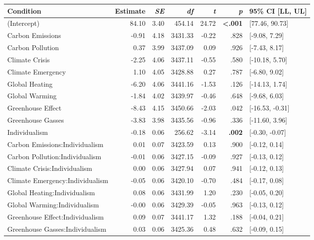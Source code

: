 \begin{table}[ht]
\centering
\begin{tabular}{lrrrrrl}
  \hline
Condition & Estimate & \textit{SE} & \textit{df} & \textit{t} & \textit{p} & 95\% CI [LL, UL] \\ 
  \hline
(Intercept) & 84.10 & 3.40 & 454.14 & 24.72 & \textbf{\textless  .001} & [77.46, 90.73] \\ 
  Carbon Emissions & -0.91 & 4.18 & 3431.33 & -0.22 & .828 & [-9.08, 7.29] \\ 
  Carbon Pollution & 0.37 & 3.99 & 3437.09 & 0.09 & .926 & [-7.43, 8.17] \\ 
  Climate Crisis & -2.25 & 4.06 & 3437.11 & -0.55 & .580 & [-10.18, 5.70] \\ 
  Climate Emergency & 1.10 & 4.05 & 3428.88 & 0.27 & .787 & [-6.80, 9.02] \\ 
  Global Heating & -6.20 & 4.06 & 3441.16 & -1.53 & .126 & [-14.13, 1.74] \\ 
  Global Warming & -1.84 & 4.02 & 3439.97 & -0.46 & .648 & [-9.68, 6.03] \\ 
  Greenhouse Effect & -8.43 & 4.15 & 3450.66 & -2.03 & .042 & [-16.53, -0.31] \\ 
  Greenhouse Gasses & -3.83 & 3.98 & 3435.56 & -0.96 & .336 & [-11.60, 3.96] \\ 
  Individualism & -0.18 & 0.06 & 256.62 & -3.14 & \textbf{.002} & [-0.30, -0.07] \\ 
  Carbon Emissions:Individualism & 0.01 & 0.07 & 3423.59 & 0.13 & .900 & [-0.12, 0.14] \\ 
  Carbon Pollution:Individualism & -0.01 & 0.06 & 3427.15 & -0.09 & .927 & [-0.13, 0.12] \\ 
  Climate Crisis:Individualism & 0.00 & 0.06 & 3427.94 & 0.07 & .941 & [-0.12, 0.13] \\ 
  Climate Emergency:Individualism & -0.05 & 0.06 & 3420.10 & -0.70 & .484 & [-0.17, 0.08] \\ 
  Global Heating:Individualism & 0.08 & 0.06 & 3431.99 & 1.20 & .230 & [-0.05, 0.20] \\ 
  Global Warming:Individualism & -0.00 & 0.06 & 3429.39 & -0.05 & .963 & [-0.13, 0.12] \\ 
  Greenhouse Effect:Individualism & 0.09 & 0.07 & 3441.17 & 1.32 & .188 & [-0.04, 0.21] \\ 
  Greenhouse Gasses:Individualism & 0.03 & 0.06 & 3425.36 & 0.48 & .632 & [-0.09, 0.15] \\ 
   \hline
\end{tabular}
\end{table}
